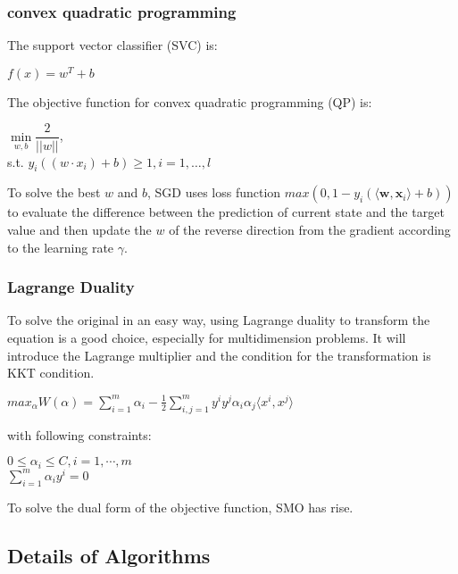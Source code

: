 \documentclass[journal,twoside,web]{ieeecolor}
\begin{document}
\subsubsection{convex quadratic programming}
The support vector classifier (SVC) is:
\begin{center}
$f(x) = w^{T} + b$
\end{center}
The objective function for convex quadratic programming (QP) is: 
\begin{center}
$\min\limits_{w, b}\dfrac{2}{\vert\vert w\vert\vert}$, \\[10pt]
s.t. $y_i((w\cdot x_i)+b)\geq 1, i=1,\dotsc, l $
\bigskip
\end{center}
To solve the best $w$ and $b$, SGD uses loss function $max(0, 1-y_i(\langle\textbf{w}, \textbf{x}_i\rangle + b))$ to evaluate the difference between the prediction of current state and the target value and then update the $w$ of the reverse direction from the gradient according to the learning rate $\gamma$. \cite{tutorial}
\bigskip 
\subsubsection{Lagrange Duality}
To solve the original in an easy way, using Lagrange duality to transform the equation is a good choice, especially for multidimension problems. \cite{tutorial} It will introduce the Lagrange multiplier and the condition for the transformation is KKT condition.\\
\begin{center}
$max_\alpha \textit{W}(\alpha) = \sum_{i=1}^{m} \alpha_i - \frac{1}{2}\sum_{i, j = 1}^{m} y^{i}y^{j}\alpha_i\alpha_j\langle x^{i},x^{j}\rangle$
\end{center}
\bigskip with following constraints:\\
\begin{center}
$0\leq \alpha_i\leq C, i = 1, \cdots, m$\\[10pt]
$\sum_{i=1}^{m} \alpha_iy^{i} = 0$
\end{center}
\bigskip
To solve the dual form of the objective function, SMO has rise. 
\subsection{Details of Algorithms}
\end{document}
